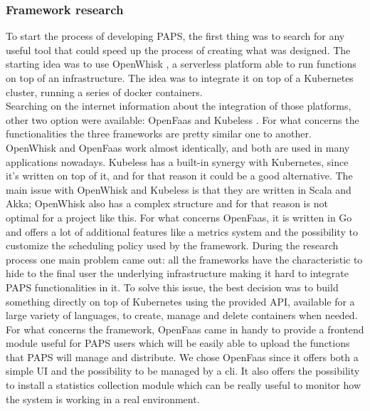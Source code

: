 \subsubsection*{Framework research}
To start the process of developing PAPS, the first thing was to search for any useful tool 
that could speed up the process of creating what was designed.  
The starting idea was to use OpenWhisk \cite{OpenWhisk}, a serverless platform able to run 
functions on top of an infrastructure. The idea was to integrate it on top of a Kubernetes 
cluster, running a series of docker \cite{Docker} containers. \\
Searching on the internet information about the integration of those platforms, other two 
option were available: OpenFaas \cite{Faas} and Kubeless \cite{Kubeless}. For what concerns 
the functionalities the three frameworks are pretty similar one to another. OpenWhisk and 
OpenFaas work almost identically, and both are used in many applications nowadays. 
Kubeless has a built-in synergy with Kubernetes, since it's written on top of it,  and for 
that reason it could be a good alternative. The main issue with OpenWhisk and Kubeless is 
that they are written in Scala and Akka; OpenWhisk also has a complex structure and for that reason 
is not optimal for a project like this. For what concerns OpenFaas, it is written
in Go and offers a lot of additional features like a metrics system and the possibility to 
customize the scheduling policy used by the framework. During the research process one main
problem came out: all the frameworks have the characteristic to hide to the final user 
the underlying infrastructure making it hard to integrate PAPS functionalities in it.
To solve this issue, the best decision was to build something directly on top of Kubernetes
using the provided API, available for a large variety of languages, to create, manage and 
delete containers when needed. \\
For what concerns the framework, OpenFaas came in handy to provide a frontend module 
useful for PAPS users which will be easily able to upload the functions that PAPS
will manage and distribute. We chose OpenFaas since it offers both a
simple UI and the possibility to be managed by a cli. It also offers the possibility to 
install a statistics collection module which can be really useful to monitor how the
system is working in a real environment.


